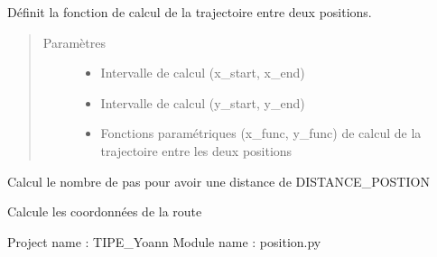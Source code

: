 \documentclass[a4paper,10pt,french]{sphinxmanual}
\begin{document}
\begin{fulllineitems}
\label{\detokenize{index:roadmaps.road.Road}}
Définit la fonction de calcul de la trajectoire entre deux positions.
\begin{quote}\begin{description}
\item[{Paramètres}] \leavevmode\begin{itemize}
\item {} 
 \textendash{} Intervalle de calcul (x\_start, x\_end)

\item {} 
 \textendash{} Intervalle de calcul (y\_start, y\_end)

\item {} 
 \textendash{} Fonctions paramétriques (x\_func, y\_func)
de calcul de la trajectoire entre les deux positions

\end{itemize}

\end{description}\end{quote}

\begin{fulllineitems}
\label{\detokenize{index:roadmaps.road.Road.init_step}}
Calcul le nombre de pas pour avoir une distance de DISTANCE\_POSTION

\end{fulllineitems}


\begin{fulllineitems}
\label{\detokenize{index:roadmaps.road.Road.setup_path}}
Calcule les coordonnées de la route

\end{fulllineitems}


\end{fulllineitems}

\label{\detokenize{index:module-roadmaps.position}}
Project name : TIPE\_Yoann
Module name : position.py
\end{document}
